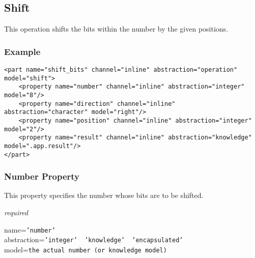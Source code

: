 %
%
%
%
%
%

\subsection{Shift}
\label{shift_heading}

This operation shifts the bits within the number by the given positions.

\subsubsection{Example}

\begin{scriptsize}
    \begin{verbatim}
<part name="shift_bits" channel="inline" abstraction="operation" model="shift">
    <property name="number" channel="inline" abstraction="integer" model="8"/>
    <property name="direction" channel="inline" abstraction="character" model="right"/>
    <property name="position" channel="inline" abstraction="integer" model="2"/>
    <property name="result" channel="inline" abstraction="knowledge" model=".app.result"/>
</part>
    \end{verbatim}
\end{scriptsize}

\subsubsection{Number Property}

This property specifies the number whose bits are to be shifted.

\emph{required}

name=\texttt{'number'}\\
abstraction=\texttt{'integer' \vline\ 'knowledge' \vline\ 'encapsulated'}\\
model=\texttt{the actual number (or knowledge model)}

